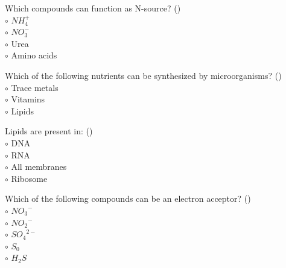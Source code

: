 \documentclass[]{beamer}
\begin{document}
\begin{frame}[shrink] {}
\addtocounter{questions}{1}
\color{blue}
Which compounds can function as N-source?   ()\\
\color{black}
\setlength{\parindent}{-0.4cm}
{\color{red}$\circ$} $NH_{4}^{+}$ \\
{\color{red}$\circ$} $NO_{3}^{-}$ \\
{\color{red}$\circ$} Urea\\
{\color{red}$\circ$} Amino acids\\
\end{frame}

\begin{frame}[shrink] {}
\addtocounter{questions}{1}
\color{blue}
Which of the following nutrients can be synthesized by microorganisms?   ()\\
\color{black}
\setlength{\parindent}{-0.4cm}
{\color{red}$\circ$}  Trace metals\\
{\color{red}$\circ$} Vitamins\\
{\color{red}$\circ$} Lipids \\
\end{frame}

\begin{frame}[shrink] {}
\addtocounter{questions}{1}
\color{blue}
Lipids are present in:   ()\\
\color{black}
\setlength{\parindent}{-0.4cm}
{\color{red}$\circ$} DNA\\
{\color{red}$\circ$} RNA\\
{\color{red}$\circ$} All membranes\\
{\color{red}$\circ$} Ribosome \\
\end{frame}

\begin{frame}[shrink] {}
\addtocounter{questions}{1}
\color{blue}
Which of the following compounds can be an electron acceptor?   ()\\
\color{black}
\setlength{\parindent}{-0.4cm}
{\color{red}$\circ$}  ${NO_{3}}^{-}$\\
{\color{red}$\circ$} ${NO_{2}}^{-}$\\
{\color{red}$\circ$} ${SO_{4}}^{2-}$\\
{\color{red}$\circ$} $S_0$\\
{\color{red}$\circ$} $H_{2}S$ \\
\end{frame}
\end{document}
